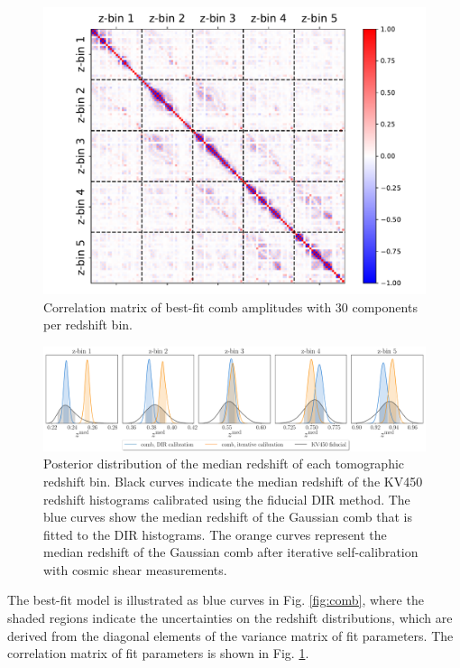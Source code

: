\documentclass{aa}
\begin{document}
\begin{figure}
\centering
\includegraphics[width=\linewidth]{plots/correlation_matrix_new.pdf}
\caption{Correlation matrix of best-fit comb amplitudes with 30 components per redshift bin.}
\label{fig:correlation_matrix}
\end{figure}
\begin{figure}
\centering
\includegraphics[width=\linewidth]{plots/posteriors_zbins.pdf}
\caption{Posterior distribution of the median redshift of each tomographic redshift bin. Black curves indicate the median redshift of the KV450 redshift histograms calibrated using the fiducial DIR method. The blue curves show the median redshift of the Gaussian comb that is fitted to the DIR histograms. The orange curves represent the median redshift of the Gaussian comb after iterative self-calibration with cosmic shear measurements.}
\label{fig:medians_posterior}
\end{figure}
The best-fit model is illustrated as blue curves in Fig. \ref{fig:comb}, where the shaded regions indicate the uncertainties on the redshift distributions, which are derived from the diagonal elements of the variance matrix of fit parameters. The correlation matrix of fit parameters is shown in Fig. \ref{fig:correlation_matrix}.  
\end{document}
